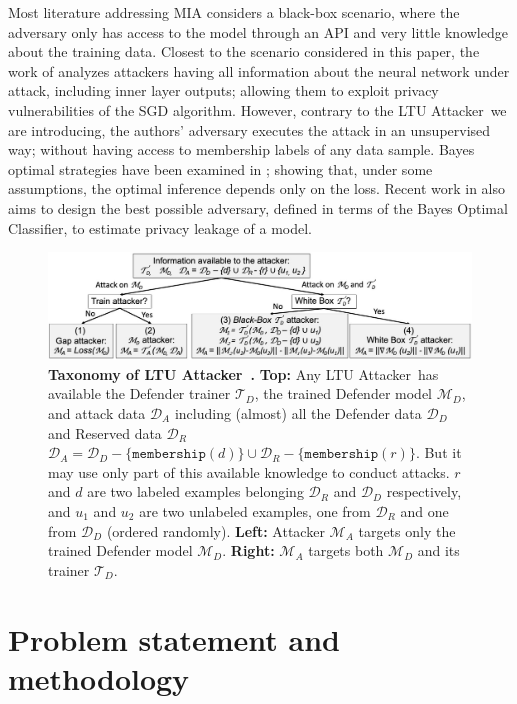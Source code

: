 \documentclass[letterpaper]{article}
\newcommand{\sminus}{-}
\newcommand{\oracle}{LTU Attacker~}
\begin{document}
Most literature addressing MIA considers a black-box scenario, where the adversary only has access to the model through an API and very little knowledge about the training data. Closest to the scenario considered in this paper, the work of \cite{nasr2019comprehensive} analyzes attackers having all information about the neural network under attack, including inner layer outputs; allowing them to exploit privacy vulnerabilities of the SGD algorithm. However, contrary to the \oracle we are introducing, the authors' adversary executes the attack in an unsupervised way; without having access to  membership labels of any data sample. Bayes optimal strategies have been examined in \cite{sablayrolles2019white}; showing that, under some assumptions, the optimal inference depends only on the loss. Recent work in \cite{liu2020mace} also aims to design the best possible adversary, defined in terms of the Bayes Optimal Classifier, to estimate privacy leakage of a model.


\begin{figure}[t]
    \centering
    \includegraphics[width=\textwidth]{Figures/Taxonomy.jpg}
    \caption{\label{fig:taxonomy} {\bf Taxonomy of \oracle.} {\bf Top:} Any \oracle has available the Defender trainer $\mathcal{T}_D$, the trained Defender model $\mathcal{M}_D$, and attack data $\mathcal{D}_A$ including (almost) all the Defender data $\mathcal{D}_D$ and Reserved data $\mathcal{D}_R$ $\mathcal{D}_A=\mathcal{D}_D\sminus\{\texttt{membership}(d)\} \cup \mathcal{D}_R\sminus\{\texttt{membership}(r)\}$. But it may use only part of this available knowledge to conduct attacks. $r$ and $d$ are two labeled examples belonging $\mathcal{D}_R$  and $\mathcal{D}_D$ respectively, and $u_1$ and $u_2$ are two unlabeled examples, one from $\mathcal{D}_R$ and one from $\mathcal{D}_D$ (ordered randomly). {\bf Left:} Attacker $\mathcal{M}_A$ targets only the trained Defender model $\mathcal{M}_D$. {\bf Right:} $\mathcal{M}_A$ targets both $\mathcal{M}_D$ and its trainer $\mathcal{T}_D$.}
\end{figure}



\section{Problem statement and methodology}
\end{document}
